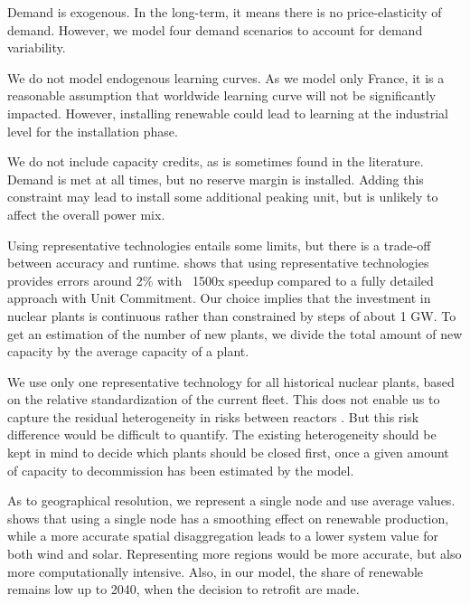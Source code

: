 Demand is exogenous.
In the long-term, it means there is no price-elasticity of demand.
However, we model four demand scenarios to account for demand variability.

We do not model endogenous learning curves. As we model only France, it is a reasonable assumption that worldwide learning curve will not be significantly impacted. However, installing renewable could lead to learning at the industrial level for the installation phase.

We do not include capacity credits, as is sometimes found in the literature. Demand is met at all times, but no reserve margin is installed. Adding this constraint may lead to install some additional peaking unit, but is unlikely to affect the overall power mix.

Using representative technologies entails some limits, but there is a trade-off between accuracy and runtime. \citet{Palmintier2014} shows that using representative technologies provides errors around 2\% with ~1500x speedup compared to a fully detailed approach with Unit Commitment. Our choice implies that the investment in nuclear plants is continuous rather than constrained by steps of about 1 GW. To get an estimation of the number of new plants, we divide the total amount of new capacity by the average capacity of a plant.

We use only one representative technology for all historical nuclear plants, based on the relative standardization of the current fleet. This does not enable us to capture the residual heterogeneity in risks between reactors \citep{GreenPeace2013}. But this risk difference would be difficult to quantify. 
The existing heterogeneity should be kept in mind to decide which plants should be closed first, once a given amount of capacity to decommission has been estimated by the model. 

As to geographical resolution, we represent a single node and use average values. \citet{Simoes2017} shows that using a single node has a smoothing effect on renewable production, while a more accurate spatial disaggregation leads to a lower system value for both wind and solar. Representing more regions would be more accurate, but also more computationally intensive. Also, in our model, the share of renewable remains low up to 2040, when the decision to retrofit are made.

